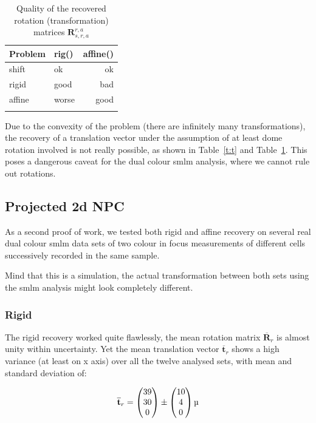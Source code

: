 \documentclass[11pt, a4paper, oneside, twocolumn]{report}
\renewcommand{\b}{\textbf}
\newcommand{\m}{\mathrm}
\begin{document}
\begin{table}[!htb]
  \caption{Quality of the recovered rotation (transformation) matrices
    $\b{R}_{s,r,a}^{r,a}$}\label{t:r}
  \begin{tabularx}{.5\textwidth}{X l r}
    \hhline{===}
    Problem & rig() & affine() \\
    \hline
    shift & ok & ok \\
    rigid & good & bad \\
    affine & worse & good \\
    \hhline{===}
  \end{tabularx}
\end{table}

Due to the convexity of the problem (there are infinitely many
transformations), the recovery of a translation vector under the
assumption of at least dome rotation involved is not really possible,
as shown in Table~\ref{t:t} and Table~\ref{t:r}. This poses a
dangerous caveat for the dual colour \gls{smlm} analysis, where we
cannot rule out rotations.


\subsection{Projected 2d NPC}

As a second proof of work, we tested both rigid and affine recovery on
several real dual colour \gls{smlm} data sets of two colour in focus
measurements of different cells successively recorded in the same
sample.

Mind that this is a simulation, the actual transformation between both
sets using the \gls{smlm} analysis might look completely different.


\subsubsection{Rigid}

The rigid recovery worked quite flawlessly, the mean rotation matrix
$\overline{\b{R}}_r$ is almost unity within uncertainty. Yet the mean
translation vector $\overline{\b{t}}_r$ shows a high variance (at
least on x axis) over all the twelve analysed sets, with mean and
standard deviation of:

\begin{equation}
  \overline{\b{t}}_r=
  \begin{pmatrix}
    39 \\
    30 \\
    0 \\
  \end{pmatrix}
  \pm
  \begin{pmatrix}
    10 \\
    4 \\
    0 \\
  \end{pmatrix}
  \si{\micro\m}
\end{equation}
\end{document}
